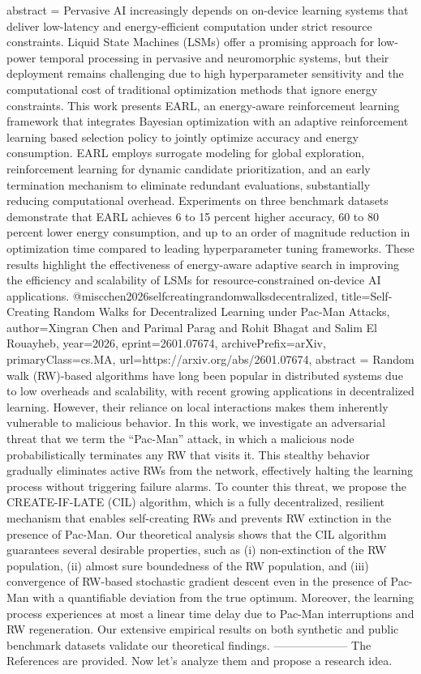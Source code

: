 {      abstract = {Pervasive AI increasingly depends on on-device learning systems that deliver low-latency and energy-efficient computation under strict resource constraints. Liquid State Machines (LSMs) offer a promising approach for low-power temporal processing in pervasive and neuromorphic systems, but their deployment remains challenging due to high hyperparameter sensitivity and the computational cost of traditional optimization methods that ignore energy constraints. This work presents EARL, an energy-aware reinforcement learning framework that integrates Bayesian optimization with an adaptive reinforcement learning based selection policy to jointly optimize accuracy and energy consumption. EARL employs surrogate modeling for global exploration, reinforcement learning for dynamic candidate prioritization, and an early termination mechanism to eliminate redundant evaluations, substantially reducing computational overhead. Experiments on three benchmark datasets demonstrate that EARL achieves 6 to 15 percent higher accuracy, 60 to 80 percent lower energy consumption, and up to an order of magnitude reduction in optimization time compared to leading hyperparameter tuning frameworks. These results highlight the effectiveness of energy-aware adaptive search in improving the efficiency and scalability of LSMs for resource-constrained on-device AI applications.}
}@misc{chen2026selfcreatingrandomwalksdecentralized,
      title={Self-Creating Random Walks for Decentralized Learning under Pac-Man Attacks}, 
      author={Xingran Chen and Parimal Parag and Rohit Bhagat and Salim El Rouayheb},
      year={2026},
      eprint={2601.07674},
      archivePrefix={arXiv},
      primaryClass={cs.MA},
      url={https://arxiv.org/abs/2601.07674},
      abstract = {Random walk (RW)-based algorithms have long been popular in distributed systems due to low overheads and scalability, with recent growing applications in decentralized learning. However, their reliance on local interactions makes them inherently vulnerable to malicious behavior. In this work, we investigate an adversarial threat that we term the ``Pac-Man'' attack, in which a malicious node probabilistically terminates any RW that visits it. This stealthy behavior gradually eliminates active RWs from the network, effectively halting the learning process without triggering failure alarms. To counter this threat, we propose the CREATE-IF-LATE (CIL) algorithm, which is a fully decentralized, resilient mechanism that enables self-creating RWs and prevents RW extinction in the presence of Pac-Man. Our theoretical analysis shows that the CIL algorithm guarantees several desirable properties, such as (i) non-extinction of the RW population, (ii) almost sure boundedness of the RW population, and (iii) convergence of RW-based stochastic gradient descent even in the presence of Pac-Man with a quantifiable deviation from the true optimum. Moreover, the learning process experiences at most a linear time delay due to Pac-Man interruptions and RW regeneration. Our extensive empirical results on both synthetic and public benchmark datasets validate our theoretical findings.}
}
        --------------------
         The References are provided. Now let's analyze them and propose a research idea.

